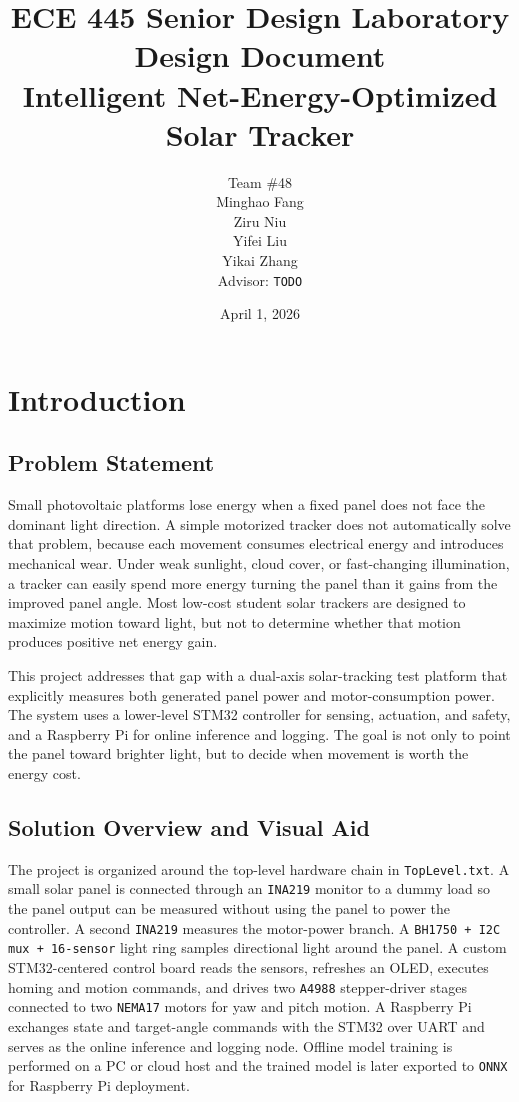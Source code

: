 \documentclass[11pt]{article}
\title{ECE 445 Senior Design Laboratory \\ Design Document \\ \vspace{0.5em} Intelligent Net-Energy-Optimized Solar Tracker}
\author{
Team \#48 \\
Minghao Fang \\
Ziru Niu \\
Yifei Liu \\
Yikai Zhang \\
Advisor: \texttt{TODO}
}
\date{April 1, 2026}
\begin{document}
\maketitle
\tableofcontents
\newpage

\section{Introduction}

\subsection{Problem Statement}
Small photovoltaic platforms lose energy when a fixed panel does not face the dominant light direction. A simple motorized tracker does not automatically solve that problem, because each movement consumes electrical energy and introduces mechanical wear. Under weak sunlight, cloud cover, or fast-changing illumination, a tracker can easily spend more energy turning the panel than it gains from the improved panel angle. Most low-cost student solar trackers are designed to maximize motion toward light, but not to determine whether that motion produces positive net energy gain.

This project addresses that gap with a dual-axis solar-tracking test platform that explicitly measures both generated panel power and motor-consumption power. The system uses a lower-level STM32 controller for sensing, actuation, and safety, and a Raspberry Pi for online inference and logging. The goal is not only to point the panel toward brighter light, but to decide when movement is worth the energy cost.

\subsection{Solution Overview and Visual Aid}
The project is organized around the top-level hardware chain in \texttt{TopLevel.txt}. A small solar panel is connected through an \texttt{INA219} monitor to a dummy load so the panel output can be measured without using the panel to power the controller. A second \texttt{INA219} measures the motor-power branch. A \texttt{BH1750 + I2C mux + 16-sensor} light ring samples directional light around the panel. A custom STM32-centered control board reads the sensors, refreshes an OLED, executes homing and motion commands, and drives two \texttt{A4988} stepper-driver stages connected to two \texttt{NEMA17} motors for yaw and pitch motion. A Raspberry Pi exchanges state and target-angle commands with the STM32 over UART and serves as the online inference and logging node. Offline model training is performed on a PC or cloud host and the trained model is later exported to \texttt{ONNX} for Raspberry Pi deployment.
\end{document}
